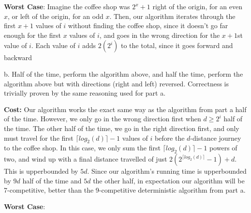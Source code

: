 \documentclass[12pt]{article}
\begin{document}
\noindent \textbf{Worst Case}: Imagine the coffee shop was $2^x+1$ right of the origin, for an even $x$, or left of the origin, for an odd $x$. Then, our algorithm iterates through the first $x+1$ values of $i$ without finding the coffee shop, since it doesn't go far enough for the first $x$ values of $i$, and goes in the wrong direction for the $x+1$st value of $i$. Each value of $i$ adds $2(2^i)$ to the total, since it goes forward and backward

b. Half of the time, perform the algorithm above, and half the time, perform the algorithm above but with directions (right and left) reversed. Correctness is trivially proven by the same reasoning used for part a.

\noindent \textbf{Cost:} Our algorithm works the exact same way as the algorithm from part a half of the time. However, we only go in the wrong direction first when $d \geq 2^i$ half of the time. The other half of the time, we go in the right direction first, and only must travel for the first $\lceil log_2(d) \rceil-1$ values of $i$ before the $d$-distance journey to the coffee shop. In this case, we only sum the first $\lceil log_2(d) \rceil-1$ powers of two, and wind up with a final distance travelled of just $2(2^{\lceil log_2(d) \rceil}-1)+d$. This is upperbounded by $5d$. Since our algorithm's running time is upperbounded by $9d$ half of the time and $5d$ the other half, in expectation our algorithm will be 7-competitive, better than the 9-competitive deterministic algorithm from part a.

\noindent \textbf{Worst Case}:
\end{document}
